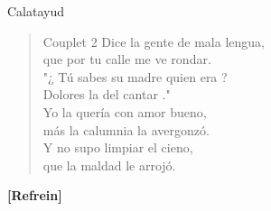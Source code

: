 \begin{song}{Calatayud}
\begin{verse}{Couplet 2}
Dice la gente de mala lengua,\\
que por tu calle me ve rondar.\hspace{1.5em}\\
"¿ Tú sabes su madre quien era ?\\
Dolores la del cantar ."\\
Yo la quería con amor bueno,\\
más la calumnia la avergonzó.\\
Y no supo\hspace{0.5em}\hspace{0.5em} limpiar el cieno,\\
que la maldad le arrojó.\\
\end{verse}
\textbf{[Refrein]}
\end{song}
